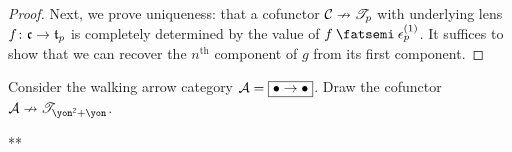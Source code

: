 \documentclass[Book-Poly]{subfiles}
\begin{document}
\begin{proof}
Next, we prove uniqueness: that a cofunctor $\mathcal{C}\nrightarrow\mathscr{T}_{p}$ with underlying lens $f\colon\mathfrak{c}\to\mathfrak{t}_p$ is completely determined by the value of $f\then\epsilon^{(1)}_p$.
It suffices to show that we can recover the $n^\text{th}$ component of $g$ from its first component.

\end{proof}


\begin{exercise}
Consider the walking arrow category $\mathcal{A}=\fbox{$\bullet\to\bullet$}$. Draw the cofunctor $\cat{A}\cof\cofree{\yon^\2+\yon}$.
\begin{solution}
**
\end{solution}
\end{exercise}
\end{document}
